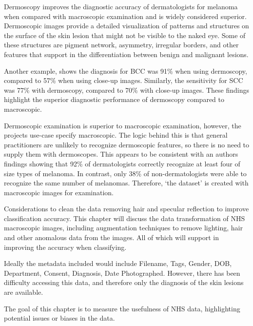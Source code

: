 Dermoscopy improves the diagnostic accuracy of dermatologists for melanoma when compared with macroscopic examination\cite{Wolner2017} and is widely considered superior\cite{Thiers2009}. Dermoscopic images provide a detailed visualization of patterns and structures on the surface of the skin lesion that might not be visible to the naked eye\cite{Thiers2009}. Some of these structures are pigment network, asymmetry, irregular borders, and other features that support in the differentiation between benign and malignant lesions\cite{Thiers2009}. 

Another example, shows the diagnosis for BCC was 91\% when using dermoscopy, compared to 57\% when using close-up images\cite{Dascalu2022}. Similarly, the sensitivity for SCC was 77\% with dermoscopy, compared to 70\% with close-up images\cite{Dascalu2022}. These findings highlight the superior diagnostic performance of dermoscopy compared to macroscopic.

Dermoscopic examination is superior to macroscopic examination, however, the projects use-case specify macroscopic. The logic behind this is that general practitioners are unlikely to recognize dermoscopic features, so there is no need to supply them with dermoscopes.  This appears to be consistent with an authors findings showing that 92\% of dermatologists correctly recognize at least four of size types of melanoma. In contrast, only 38\% of non-dermatologists were able to recognize the same number of melanomas\cite{Tae2019}. Therefore, `the dataset' is created with macroscopic images for examination.

Considerations to clean the data removing hair and specular reflection to improve classification accuracy. This chapter will discuss the data transformation of NHS macroscopic images, including augmentation techniques to remove lighting, hair and other anomalous data from the images. All of which will support in improving the accuracy when classifying.

Ideally the metadata included would include Filename, Tags, Gender, DOB, Department, Consent, Diagnosis, Date Photographed. However, there has been difficulty accessing this data, and therefore only the diagnosis of the skin lesions are available.

The goal of this chapter is to measure the usefulness of NHS data, highlighting potential issues or biases in the data.

